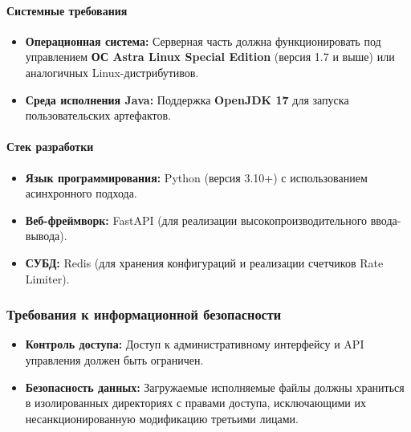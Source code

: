 \documentclass[
]{article}
\begin{document}
\paragraph{Системные
требования}\label{ux441ux438ux441ux442ux435ux43cux43dux44bux435-ux442ux440ux435ux431ux43eux432ux430ux43dux438ux44f}

\begin{itemize}
\item
  \textbf{Операционная система:} Серверная часть должна функционировать
  под управлением \textbf{ОС Astra Linux Special Edition} (версия 1.7 и
  выше) или аналогичных Linux-дистрибутивов.
\item
  \textbf{Среда исполнения Java:} Поддержка \textbf{OpenJDK 17} для
  запуска пользовательских артефактов.
\end{itemize}

\paragraph{Стек
разработки}\label{ux441ux442ux435ux43a-ux440ux430ux437ux440ux430ux431ux43eux442ux43aux438}

\begin{itemize}
\item
  \textbf{Язык программирования:} Python (версия 3.10+) с использованием
  асинхронного подхода.
\item
  \textbf{Веб-фреймворк:} FastAPI (для реализации
  высокопроизводительного ввода-вывода).
\item
  \textbf{СУБД:} Redis (для хранения конфигураций и реализации счетчиков
  Rate Limiter).
\end{itemize}

\subsubsection{Требования к информационной
безопасности}\label{ux442ux440ux435ux431ux43eux432ux430ux43dux438ux44f-ux43a-ux438ux43dux444ux43eux440ux43cux430ux446ux438ux43eux43dux43dux43eux439-ux431ux435ux437ux43eux43fux430ux441ux43dux43eux441ux442ux438}

\begin{itemize}
\item
  \textbf{Контроль доступа:} Доступ к административному интерфейсу и API
  управления должен быть ограничен.
\item
  \textbf{Безопасность данных:} Загружаемые исполняемые файлы должны
  храниться в изолированных директориях с правами доступа, исключающими
  их несанкционированную модификацию третьими лицами.
\end{itemize}
\end{document}

